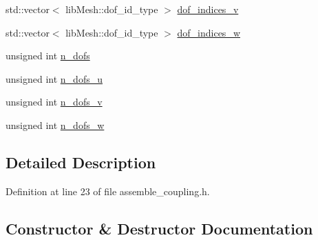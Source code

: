 \begin{DoxyCompactItemize}
std\+::vector$<$ lib\+Mesh\+::dof\+\_\+id\+\_\+type $>$ \hyperlink{classcarl_1_1lib_mesh__fe__addresses__3_afc4eda615f6af70d704974b4af3dc25e}{dof\+\_\+indices\+\_\+v}
\item 
std\+::vector$<$ lib\+Mesh\+::dof\+\_\+id\+\_\+type $>$ \hyperlink{classcarl_1_1lib_mesh__fe__addresses__3_ac7668338feadf63c7a02e57255888167}{dof\+\_\+indices\+\_\+w}
\item 
unsigned int \hyperlink{classcarl_1_1lib_mesh__fe__addresses__3_a58f0a44b9a123347f35281cbc58e7206}{n\+\_\+dofs}
\item 
unsigned int \hyperlink{classcarl_1_1lib_mesh__fe__addresses__3_a4f131cedd24e8c5ec44bfbb50acf8b17}{n\+\_\+dofs\+\_\+u}
\item 
unsigned int \hyperlink{classcarl_1_1lib_mesh__fe__addresses__3_a8e5c89ad957ccce0c03fcc14f51ab4ba}{n\+\_\+dofs\+\_\+v}
\item 
unsigned int \hyperlink{classcarl_1_1lib_mesh__fe__addresses__3_ac62177ed269417b444a1174e142b48fa}{n\+\_\+dofs\+\_\+w}
\end{DoxyCompactItemize}


\subsection{Detailed Description}


Definition at line 23 of file assemble\+\_\+coupling.\+h.



\subsection{Constructor \& Destructor Documentation}
\hypertarget{classcarl_1_1lib_mesh__fe__addresses__3_a5ecefb94eec8a2cad6c21ccc12c524d9}{}
